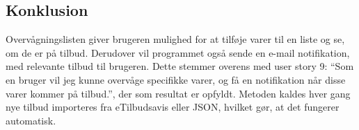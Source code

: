 \subsection{Konklusion}
Overvågningslisten giver brugeren mulighed for at tilføje varer til en liste og se, om de er på tilbud. 
Derudover vil programmet også sende en e-mail notifikation, med relevante tilbud til brugeren. 
Dette stemmer overens med user story 9: ``Som en bruger vil jeg kunne overvåge specifikke varer, og få en notifikation når disse varer kommer på tilbud.'', der som resultat er opfyldt.
Metoden kaldes hver gang nye tilbud importeres fra eTilbudsavis eller JSON, hvilket gør, at det fungerer automatisk.
